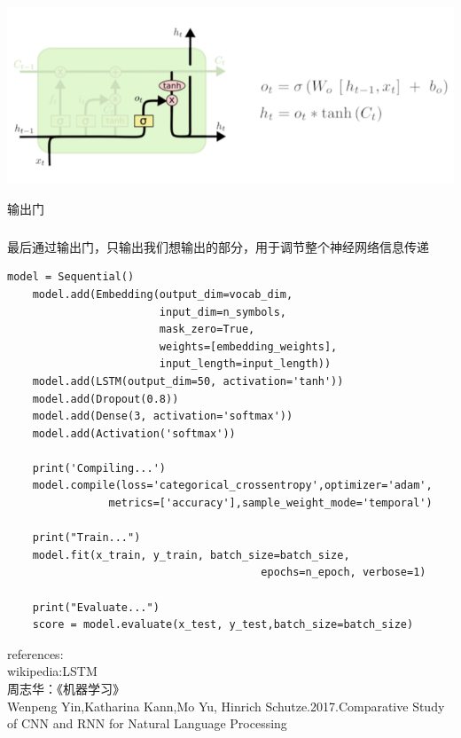 \documentclass[UTF8]{article}
\begin{document}
\begin{center}
\includegraphics[width=0.8\linewidth]{4.PNG}
\end{center}
\centerline{输出门}
\subparagraph{}最后通过输出门，只输出我们想输出的部分，用于调节整个神经网络信息传递






\lstset{language=python}
\begin{lstlisting}
model = Sequential()
    model.add(Embedding(output_dim=vocab_dim,
                        input_dim=n_symbols,
                        mask_zero=True,
                        weights=[embedding_weights],
                        input_length=input_length))
    model.add(LSTM(output_dim=50, activation='tanh'))
    model.add(Dropout(0.8))
    model.add(Dense(3, activation='softmax'))
    model.add(Activation('softmax'))

    print('Compiling...')
    model.compile(loss='categorical_crossentropy',optimizer='adam',
                metrics=['accuracy'],sample_weight_mode='temporal')

    print("Train...")
    model.fit(x_train, y_train, batch_size=batch_size,
                                        epochs=n_epoch, verbose=1)

    print("Evaluate...")
    score = model.evaluate(x_test, y_test,batch_size=batch_size)
\end{lstlisting}

references:\\
wikipedia:LSTM\\
周志华：《机器学习》\\
Wenpeng Yin,Katharina Kann,Mo Yu, Hinrich Schutze.2017.Comparative Study of CNN and RNN for Natural Language Processing  \\
\end{document}
